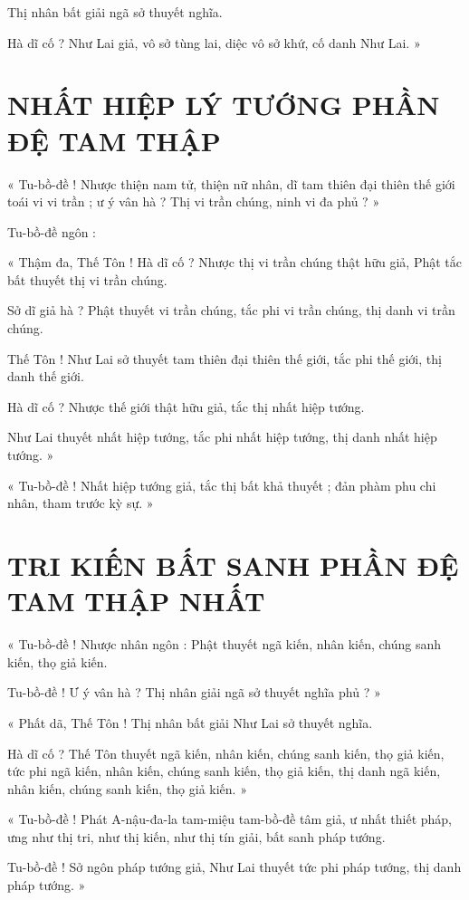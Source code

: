 	Thị nhân bất giải ngã sở thuyết nghĩa.
	
	Hà dĩ cố ? Như Lai giả, vô sở tùng lai, diệc vô sở khứ, cố danh Như Lai. »
	
	\section*{NHẤT HIỆP LÝ TƯỚNG PHẦN ĐỆ TAM THẬP}
	
	« Tu-bồ-đề ! Nhược thiện nam tử, thiện nữ nhân, dĩ tam thiên đại thiên thế giới toái vi vi trần ; ư ý vân hà ? Thị vi trần chúng, ninh vi đa phủ ? »
	
	Tu-bồ-đề ngôn :
	
	« Thậm đa, Thế Tôn ! Hà dĩ cố ? Nhược thị vi trần chúng thật hữu giả, Phật tắc bất thuyết thị vi trần chúng. 
	
	Sở dĩ giả hà ? Phật thuyết vi trần chúng, tắc phi vi trần chúng, thị danh vi trần chúng.
	
	Thế Tôn ! Như Lai sở thuyết tam thiên đại thiên thế giới, tắc phi thế giới, thị danh thế giới. 
	
	Hà dĩ cố ? Nhược thế giới thật hữu giả, tắc thị nhất hiệp tướng. 
	
	Như Lai thuyết nhất hiệp tướng, tắc phi nhất hiệp tướng, thị danh nhất hiệp tướng. »
	
	« Tu-bồ-đề ! Nhất hiệp tướng giả, tắc thị bất khả thuyết ; đản phàm phu chi nhân, tham trước kỳ sự. »
	
	
	\section*{TRI KIẾN BẤT SANH PHẦN ĐỆ TAM THẬP NHẤT}
	
	« Tu-bồ-đề ! Nhược nhân ngôn : Phật thuyết ngã kiến, nhân kiến, chúng sanh kiến, thọ giả kiến.
	
	Tu-bồ-đề ! Ư ý vân hà ? Thị nhân giải ngã sở thuyết nghĩa phủ ? »
	
	« Phất dã, Thế Tôn ! Thị nhân bất giải Như Lai sở thuyết nghĩa. 
	
	Hà dĩ cố ? Thế Tôn thuyết ngã kiến, nhân kiến, chúng sanh kiến, thọ giả kiến, tức phi ngã kiến, nhân kiến, chúng sanh kiến, thọ giả kiến, thị danh ngã kiến, nhân kiến, chúng sanh kiến, thọ giả kiến. »
	
	« Tu-bồ-đề ! Phát A-nậu-đa-la tam-miệu tam-bồ-đề tâm giả, ư nhất thiết pháp, ưng như thị tri, như thị kiến, như thị tín giải, bất sanh pháp tướng. 
	
	Tu-bồ-đề ! Sở ngôn pháp tướng giả, Như Lai thuyết tức phi pháp tướng, thị danh pháp tướng. »
	

